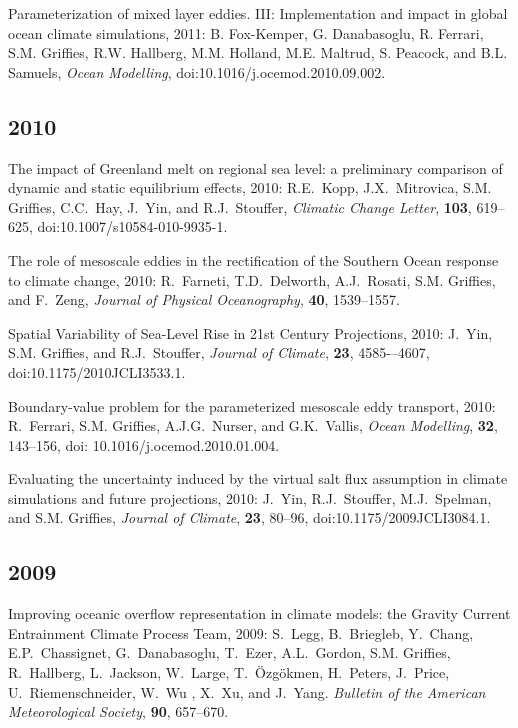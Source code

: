 \begin{etaremune}
\item Parameterization of mixed layer eddies. III: Implementation and impact in global ocean climate simulations, 2011: B. Fox-Kemper, G. Danabasoglu, R. Ferrari, S.M. Grif\/f\/ies, R.W. Hallberg, M.M. Holland, M.E. Maltrud, S. Peacock, and B.L. Samuels, {\it Ocean Modelling}, doi:10.1016/j.ocemod.2010.09.002.

\subsection*{\sc \color{Maroon} 2010}

\item The impact of Greenland melt on regional sea level: a preliminary comparison of dynamic and static equilibrium effects, 2010: R.E.\ Kopp, J.X.\ Mitrovica, S.M. Grif\/f\/ies, C.C.\  Hay, J.\ Yin, and R.J.\ Stouffer, {\it Climatic Change Letter}, {\bf 103}, 619--625, doi:10.1007/s10584-010-9935-1.

\item The role of mesoscale eddies in the rectification of the Southern Ocean response to climate change, 2010: R.\ Farneti, T.D.\  Delworth, A.J.\ Rosati, S.M. Grif\/f\/ies, and F.\ Zeng, {\it Journal of Physical Oceanography}, {\bf 40}, 1539--1557.

\item Spatial Variability of Sea-Level Rise in 21st Century Projections, 2010: J.\ Yin, S.M. Grif\/f\/ies, and R.J.\ Stouffer, {\it Journal of Climate}, {\bf 23}, 4585-–4607, doi:10.1175/2010JCLI3533.1.

\item Boundary-value problem for the parameterized mesoscale eddy transport, 2010: R.\ Ferrari, S.M. Grif\/f\/ies, A.J.G.\  Nurser, and G.K.\ Vallis, {\em Ocean Modelling}, {\bf 32}, 143--156, doi: 10.1016/j.ocemod.2010.01.004.

\item Evaluating the uncertainty induced by the virtual salt flux assumption in climate simulations and future projections, 2010: J.\  Yin, R.J.\ Stouffer, M.J.\ Spelman, and S.M. Grif\/f\/ies, {\em Journal of Climate}, {\bf 23}, 80--96, doi:10.1175/2009JCLI3084.1. 

\subsection*{\sc \color{Maroon} 2009}


\item Improving oceanic overflow representation in climate models: the   Gravity Current Entrainment Climate Process Team, 2009: S.\ Legg, B.\ Briegleb, Y.\ Chang, E.P.\ Chassignet, G.\ Danabasoglu, T.\ Ezer, A.L.\ Gordon, S.M. Grif\/f\/ies, R.\ Hallberg, L.\ Jackson, W.\ Large, T.\ \"Ozg\"okmen, H.\ Peters, J.\ Price, U.\
  Riemenschneider, W.\ Wu , X.\ Xu, and J.\ Yang.  {\em Bulletin of the American Meteorological Society}, {\bf 90}, 657--670.


\end{etaremune}
